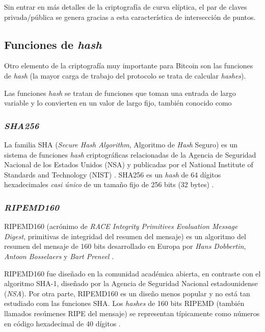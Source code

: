 Sin entrar en más detalles de la criptografía de curva elíptica, el par de claves privada/pública se genera gracias a esta característica de intersección de puntos.

\subsection{Funciones de \emph{hash}}

Otro elemento de la criptografía muy importante para Bitcoin son las funciones de \emph{hash} (la mayor carga de trabajo del protocolo se trata de calcular \emph{hashes}).

Las funciones \emph{hash} se tratan de funciones que toman una entrada de largo variable y lo convierten en un valor de largo fijo, también conocido como  \autocite{VanhouvtenHashIntro} 

\subsubsection{\emph{SHA256}}

La familia SHA (\emph{Secure Hash Algorithm}, Algoritmo de \emph{Hash} Seguro) es un sistema de funciones \emph{hash} criptográficas relacionadas de la Agencia de Seguridad Nacional de los Estados Unidos (NSA) y publicadas por el National Institute of Standards and Technology (NIST) \autocite{WikipediaSHA}. SHA256 es un \emph{hash} de 64 dígitos hexadecimales \emph{casi único} de un tamaño fijo de 256 bits (32 bytes) \autocite{OroYFinanzasSHA}. 

\subsubsection{\emph{RIPEMD160}}

RIPEMD160 (acrónimo de \emph{RACE Integrity Primitives Evaluation Message Digest}, primitivas de integridad del resumen del mensaje) es un algoritmo del resumen del mensaje de 160 bits desarrollado en Europa por \emph{Hans Dobbertin}, \emph{Antoon Bosselaers} y \emph{Bart Preneel} \autocite{WikipediaRIPEMD160}.

RIPEMD160 fue diseñado en la comunidad académica abierta, en contraste con el algoritmo SHA-1, diseñado por la Agencia de Seguridad Nacional estadounidense (\emph{NSA}). Por otra parte, RIPEMD160 es un diseño menos popular y no está tan estudiado com las funciones SHA. Los \emph{hashes} de 160 bits RIPEMD (también llamados resúmenes RIPE del mensaje) se representan típicamente como números en código hexadecimal de 40 dígitos \autocite{OroYFinanzasRIPEMD160}.


